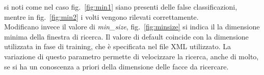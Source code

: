 \documentclass[a4paper,11pt]{article}
\begin{document}
si noti come nel caso fig.~\ref{fig:min1} siano presenti delle false
classificazioni, mentre in fig.~\ref{fig:min2} i volti vengono
rilevati correttamente.\\

Modificano invece il valore di \emph{min\_size},
fig.~\ref{fig:minsize} si indica il la dimensione minima della
finestra di ricerca. Il valore di default coincide con la dimensione
utilizzata in fase di training, che è specificata nel file XML
utilizzato. La variazione di questo parametro permette di velocizzare
la ricerca, anche di molto, se si ha un conoscenza a priori della
dimensione delle facce da ricercare.

\begin{figure}[htbp]
  \centering

\end{figure}
\end{document}
